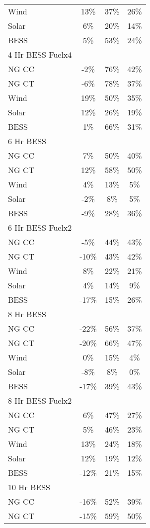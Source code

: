 \begin{table*}[htbp]
\begin{tabular}{lccc}
\quad Wind & 13\% & 37\% & 26\% \\
\quad Solar & 6\% & 20\% & 14\% \\
\quad BESS & 5\% & 53\% & 24\% \\
\midrule
4 Hr BESS Fuelx4 \\
\quad NG CC & -2\% & 76\% & 42\% \\
\quad NG CT & -6\% & 78\% & 37\% \\
\quad Wind & 19\% & 50\% & 35\% \\
\quad Solar & 12\% & 26\% & 19\% \\
\quad BESS & 1\% & 66\% & 31\% \\
\midrule
6 Hr BESS \\
\quad NG CC & 7\% & 50\% & 40\% \\
\quad NG CT & 12\% & 58\% & 50\% \\
\quad Wind & 4\% & 13\% & 5\% \\
\quad Solar & -2\% & 8\% & 5\% \\
\quad BESS & -9\% & 28\% & 36\% \\
\midrule
6 Hr BESS Fuelx2 \\
\quad NG CC & -5\% & 44\% & 43\% \\
\quad NG CT & -10\% & 43\% & 42\% \\
\quad Wind & 8\% & 22\% & 21\% \\
\quad Solar & 4\% & 14\% & 9\% \\
\quad BESS & -17\% & 15\% & 26\% \\
\midrule
8 Hr BESS \\
\quad NG CC & -22\% & 56\% & 37\% \\
\quad NG CT & -20\% & 66\% & 47\% \\
\quad Wind & 0\% & 15\% & 4\% \\
\quad Solar & -8\% & 8\% & 0\% \\
\quad BESS & -17\% & 39\% & 43\% \\
\midrule
8 Hr BESS Fuelx2 \\
\quad NG CC & 6\% & 47\% & 27\% \\
\quad NG CT & 5\% & 46\% & 23\% \\
\quad Wind & 13\% & 24\% & 18\% \\
\quad Solar & 12\% & 19\% & 12\% \\
\quad BESS & -12\% & 21\% & 15\% \\
\midrule
10 Hr BESS \\
\quad NG CC & -16\% & 52\% & 39\% \\
\quad NG CT & -15\% & 59\% & 50\% \\

\end{tabular}
\end{table*}
